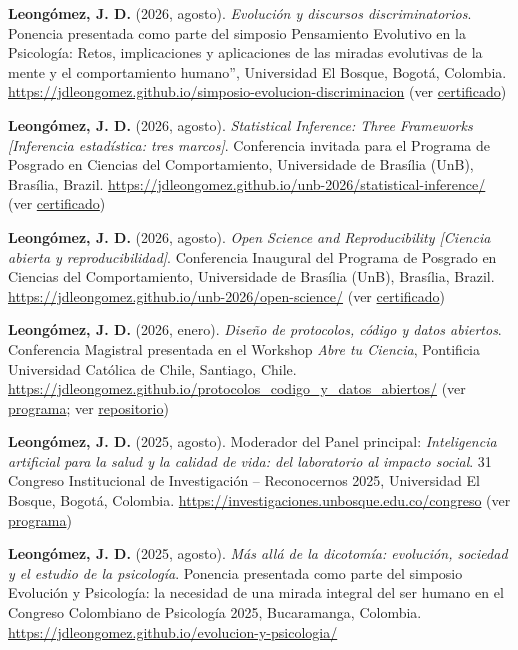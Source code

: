 \documentclass[11pt,a4paper,]{awesome-cv}
\begin{document}
\textbf{Leongómez, J. D.} (2026, agosto). \emph{Evolución y discursos
discriminatorios}. Ponencia presentada como parte del simposio
Pensamiento Evolutivo en la Psicología: Retos, implicaciones y
aplicaciones de las miradas evolutivas de la mente y el comportamiento
humano'', Universidad El Bosque, Bogotá, Colombia.
\url{https://jdleongomez.github.io/simposio-evolucion-discriminacion}
(ver
\href{https://jdleongomez.info/es/files/Cert_simposio_evolucion_psicologia_2026.pdf}{certificado})

\textbf{Leongómez, J. D.} (2026, agosto). \emph{Statistical Inference:
Three Frameworks {[}Inferencia estadística: tres marcos{]}}. Conferencia
invitada para el Programa de Posgrado en Ciencias del Comportamiento,
Universidade de Brasília (UnB), Brasília, Brazil.
\url{https://jdleongomez.github.io/unb-2026/statistical-inference/} (ver
\href{https://jdleongomez.info/es/files/SEI_14742570_Declaracao.pdf}{certificado})

\textbf{Leongómez, J. D.} (2026, agosto). \emph{Open Science and
Reproducibility {[}Ciencia abierta y reproducibilidad{]}}. Conferencia
Inaugural del Programa de Posgrado en Ciencias del Comportamiento,
Universidade de Brasília (UnB), Brasília, Brazil.
\url{https://jdleongomez.github.io/unb-2026/open-science/} (ver
\href{https://jdleongomez.info/es/files/SEI_14742570_Declaracao.pdf}{certificado})

\textbf{Leongómez, J. D.} (2026, enero). \emph{Diseño de protocolos,
código y datos abiertos}. Conferencia Magistral presentada en el
Workshop \emph{Abre tu Ciencia}, Pontificia Universidad Católica de
Chile, Santiago, Chile.
\url{https://jdleongomez.github.io/protocolos_codigo_y_datos_abiertos/}
(ver \href{https://atc26.com/programa-dia2-conferencia1.html}{programa};
ver
\href{https://github.com/JDLeongomez/protocolos_codigo_y_datos_abiertos}{repositorio})

\textbf{Leongómez, J. D.} (2025, agosto). Moderador del Panel principal:
\emph{Inteligencia artificial para la salud y la calidad de vida: del
laboratorio al impacto social}. 31 Congreso Institucional de
Investigación -- Reconocernos 2025, Universidad El Bosque, Bogotá,
Colombia. \url{https://investigaciones.unbosque.edu.co/congreso} (ver
\href{https://investigaciones.unbosque.edu.co/s/Programacion-congreso_13AG.pdf}{programa})

\textbf{Leongómez, J. D.} (2025, agosto). \emph{Más allá de la
dicotomía: evolución, sociedad y el estudio de la psicología}. Ponencia
presentada como parte del simposio Evolución y Psicología: la necesidad
de una mirada integral del ser humano en el Congreso Colombiano de
Psicología 2025, Bucaramanga, Colombia.
\url{https://jdleongomez.github.io/evolucion-y-psicologia/}
\end{document}
